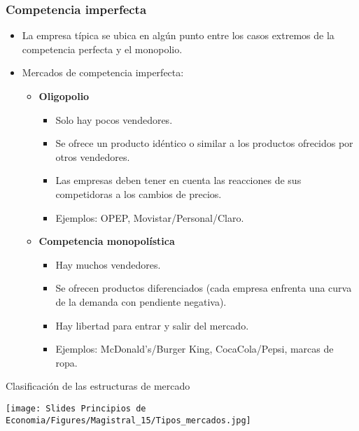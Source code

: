 \documentclass{beamer}
\begin{document}
\begin{frame}
\frametitle{Competencia imperfecta}
\begin{itemize}
    \item La empresa típica se ubica en algún punto entre los casos extremos de la competencia perfecta y el monopolio. \vspace{2mm}
    \item Mercados de competencia imperfecta: \vspace{1mm}
    \begin{itemize}
        \item \textbf{Oligopolio}
        \begin{itemize}
        \item Solo hay pocos vendedores.
        \item Se ofrece un producto idéntico o similar a los productos ofrecidos por otros vendedores.
        \item Las empresas deben tener en cuenta las reacciones de sus competidoras a los cambios de precios.
        \item Ejemplos: OPEP, Movistar/Personal/Claro. 
        \end{itemize} 
        \vspace{1mm}
        \item \textbf{Competencia monopolística}
        \begin{itemize}
        \item Hay muchos vendedores.
        \item Se ofrecen productos diferenciados (cada empresa enfrenta una curva de la demanda con pendiente negativa).
        \item Hay libertad para entrar y salir del mercado. 
        \item Ejemplos: McDonald's/Burger King, CocaCola/Pepsi, marcas de ropa.
         \end{itemize} 
    \end{itemize}
    \end{itemize}
\end{frame}


\begin{frame}{Clasificación de las estructuras de mercado}

\centering
\texttt{[image: Slides Principios de Economia/Figures/Magistral\_15/Tipos\_mercados.jpg]}

\end{frame}
\end{document}

